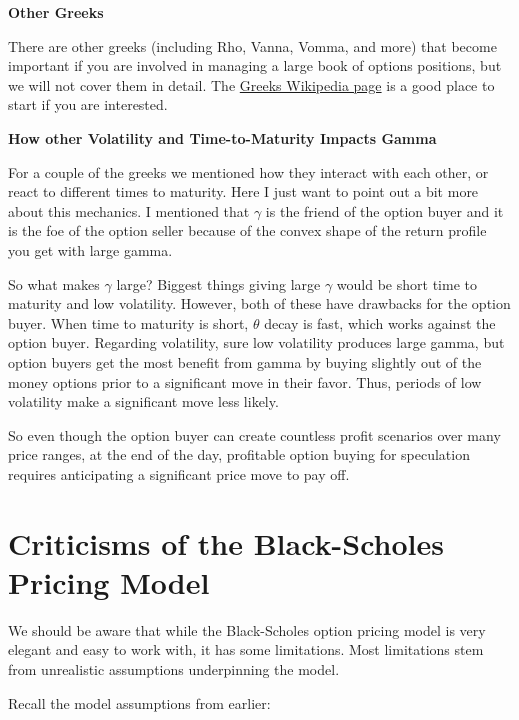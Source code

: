 \documentclass[
  letterpaper,
  DIV=11,
  numbers=noendperiod]{scrreprt}
\begin{document}
\textbf{Other Greeks}

There are other greeks (including Rho, Vanna, Vomma, and more) that
become important if you are involved in managing a large book of options
positions, but we will not cover them in detail. The
\href{https://en.wikipedia.org/wiki/Greeks_(finance)}{Greeks Wikipedia
page} is a good place to start if you are interested.

\textbf{How other Volatility and Time-to-Maturity Impacts Gamma}

For a couple of the greeks we mentioned how they interact with each
other, or react to different times to maturity. Here I just want to
point out a bit more about this mechanics. I mentioned that \(\gamma\)
is the friend of the option buyer and it is the foe of the option seller
because of the convex shape of the return profile you get with large
gamma.

So what makes \(\gamma\) large? Biggest things giving large \(\gamma\)
would be short time to maturity and low volatility. However, both of
these have drawbacks for the option buyer. When time to maturity is
short, \(\theta\) decay is fast, which works against the option buyer.
Regarding volatility, sure low volatility produces large gamma, but
option buyers get the most benefit from gamma by buying slightly out of
the money options prior to a significant move in their favor. Thus,
periods of low volatility make a significant move less likely.

So even though the option buyer can create countless profit scenarios
over many price ranges, at the end of the day, profitable option buying
for speculation requires anticipating a significant price move to pay
off.

\hypertarget{criticisms-of-the-black-scholes-pricing-model}{%
\section{Criticisms of the Black-Scholes Pricing
Model}\label{criticisms-of-the-black-scholes-pricing-model}}

We should be aware that while the Black-Scholes option pricing model is
very elegant and easy to work with, it has some limitations. Most
limitations stem from unrealistic assumptions underpinning the model.

Recall the model assumptions from earlier:
\end{document}
